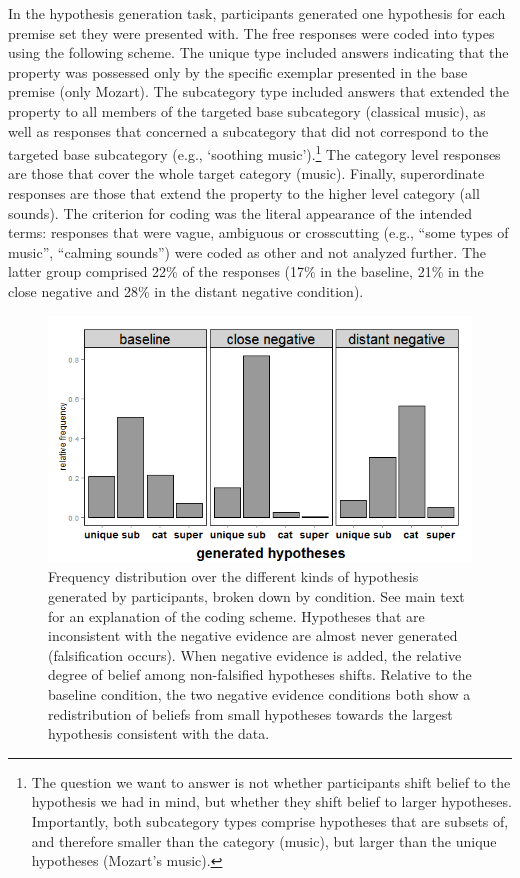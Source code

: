 \documentclass[authoryear,11pt]{elsarticle}
\begin{document}
In the hypothesis generation task, participants generated one hypothesis for each premise set they were presented with. The free responses were coded into types using the following scheme. The {\sc unique} type included answers indicating that the property was possessed only by the specific exemplar presented in the base premise (only Mozart). The {\sc subcategory} type included answers that extended the property to all members of the targeted base subcategory (classical music), as well as responses that concerned a subcategory that did not correspond to the targeted base subcategory (e.g., `soothing music').\footnote{ The question we want to answer is not whether participants shift belief to the hypothesis we had in mind, but whether they shift belief to larger hypotheses. Importantly, both {\sc subcategory} types comprise hypotheses that are subsets of, and therefore smaller than the category (music), but larger than the {\sc unique} hypotheses (Mozart's music).}  The {\sc category} level responses are those that cover the whole target category (music). Finally, {\sc superordinate} responses are those that extend the property to the higher level category (all sounds). The criterion for coding was the literal appearance of the intended terms: responses that were vague, ambiguous or crosscutting (e.g., ``some types of music'', ``calming sounds'') were coded as {\sc other} and not analyzed further. The latter group comprised 22\% of the responses (17\% in the {\sc baseline}, 21\% in the {\sc close negative} and 28\% in the {\sc distant negative} condition).

\begin{figure}[t]
\begin{center}
\includegraphics[trim=0cm -.5cm 0cm 0cm, clip=true, scale=.45]{fig/Exp1_hgen.png}
\end{center}
\vspace{-10mm}
\caption{\small Frequency distribution over the different kinds of hypothesis generated by participants, broken down by condition. See main text for an explanation of the coding scheme. Hypotheses that are inconsistent with the negative evidence are almost never generated (falsification occurs). When negative evidence is added, the relative degree of belief among non-falsified hypotheses shifts. Relative to the {\sc baseline} condition, the two {\sc negative} evidence conditions both show a redistribution of beliefs from small hypotheses towards the largest hypothesis consistent with the data. \normalsize}
\label{rulegen}
\end{figure}
\end{document}
